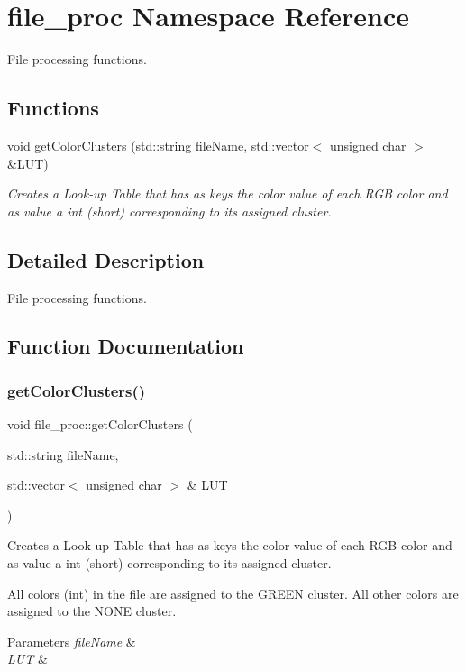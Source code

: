 \hypertarget{namespacefile__proc}{}\section{file\+\_\+proc Namespace Reference}
\label{namespacefile__proc}


File processing functions.  


\subsection*{Functions}
\begin{DoxyCompactItemize}
\item 
void \hyperlink{namespacefile__proc_afe1e8eae5165c20627858896c1dc930f}{get\+Color\+Clusters} (std\+::string file\+Name, std\+::vector$<$ unsigned char $>$ \&L\+UT)
\begin{DoxyCompactList}\small\item\em Creates a Look-\/up Table that has as keys the color value of each R\+GB color and as value a int (short) corresponding to its assigned cluster. \end{DoxyCompactList}\end{DoxyCompactItemize}


\subsection{Detailed Description}
File processing functions. 

\subsection{Function Documentation}
\mbox{\label{namespacefile__proc_afe1e8eae5165c20627858896c1dc930f}} 
\subsubsection{\texorpdfstring{get\+Color\+Clusters()}{get_color_clusters()}}
{\footnotesize\ttfamily void file\+\_\+proc\+::get\+Color\+Clusters (\begin{DoxyParamCaption}\item[{std\+::string}]{file\+Name,  }\item[{std\+::vector$<$ unsigned char $>$ \&}]{L\+UT }\end{DoxyParamCaption})}



Creates a Look-\/up Table that has as keys the color value of each R\+GB color and as value a int (short) corresponding to its assigned cluster. 

All colors (int) in the file are assigned to the G\+R\+E\+EN cluster. All other colors are assigned to the N\+O\+NE cluster. 
\begin{DoxyParams}{Parameters}
{\em file\+Name} & \\
\hline
{\em L\+UT} & \\
\hline
\end{DoxyParams}
